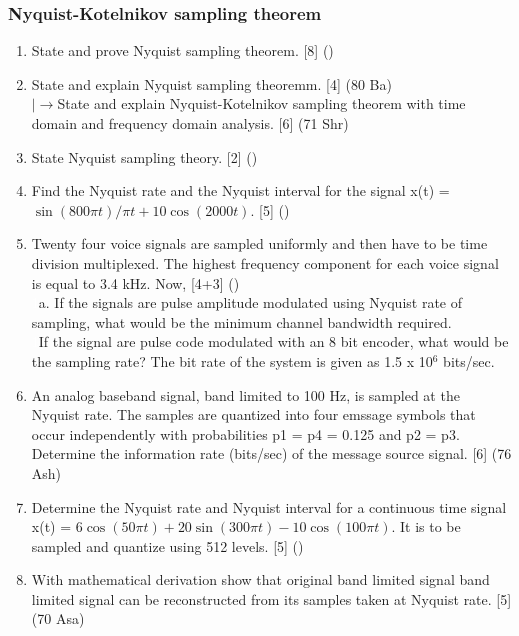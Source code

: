 \documentclass[12pt]{article}
\newcommand{\lb}{\\$\left|\rightarrow\right.$}
\newcommand{\enter}{\\\textcolor{white}{1}}
\begin{document}
    \subsubsection{Nyquist-Kotelnikov sampling theorem}
    	\begin{enumerate}
    		\item State and prove Nyquist sampling theorem. \hfill [8] ()
    		
    		\item State and explain Nyquist sampling theoremm. \hfill [4] (80 Ba)
    		\lb State and explain Nyquist-Kotelnikov sampling theorem with time domain and frequency domain analysis. \hfill [6] (71 Shr)
    		
    		\item State Nyquist sampling theory. \hfill [2] ()
    		
    		\item Find the Nyquist rate and the Nyquist interval for the signal x(t) = $\sin(800\pi t)/\pi t + 10 \cos(2000t)$. \hfill [5] ()
    		
    		\item Twenty four voice signals are sampled uniformly and then have to be time division multiplexed. The highest frequency component for each voice signal is equal to 3.4 kHz. Now, \hfill [4+3] ()
    		\enter a. If the signals are pulse amplitude modulated using Nyquist rate of sampling, what would be the minimum channel bandwidth required.
    		\enter If the signal are pulse code modulated with an 8 bit encoder, what would be the sampling rate? The bit rate of the system is given as 1.5 x 10$^6$ bits/sec.
    		
	        \item An analog baseband signal, band limited to 100 Hz, is sampled at the Nyquist rate. The samples are quantized into four emssage symbols that occur independently with probabilities p1 = p4 = 0.125 and p2 = p3. Determine the information rate (bits/sec) of the message source signal. \hfill [6] (76 Ash)
	        
	        \item Determine the Nyquist rate and Nyquist interval for a continuous time signal x(t) = $6\cos(50\pi t) + 20\sin(300\pi t) - 10\cos(100\pi t)$. It is to be sampled and quantize using 512 levels. \hfill [5] ()
	        
	        \item With mathematical derivation show that original band limited signal band limited signal can be reconstructed from its samples taken at Nyquist rate. \hfill [5] (70 Asa)
    	\end{enumerate}
    
\end{document}
